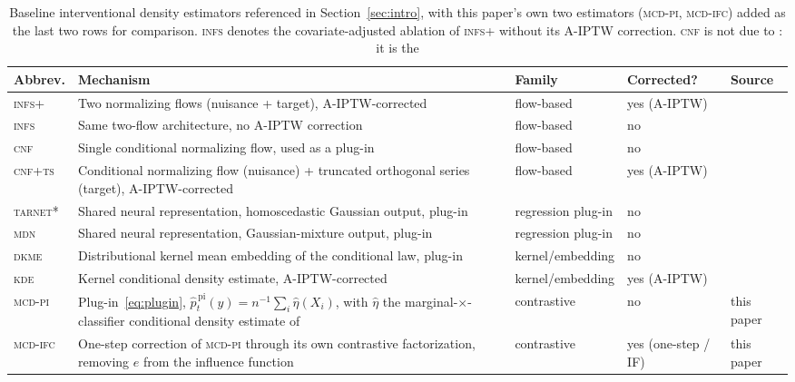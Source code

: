 \documentclass[11pt]{article}
\theoremstyle{plain}
\theoremstyle{definition}
\theoremstyle{remark}
\newcommand{\gps}{e}
\begin{document}
\begin{table}[htbp]
\centering
\small
\begin{tabular}{@{}lp{5.6cm}lll@{}}
\toprule
Abbrev. & Mechanism & Family & Corrected? & Source \\
\midrule
\textsc{infs+} & Two normalizing flows (nuisance + target), A-IPTW-corrected & flow-based & yes (A-IPTW) & \citet{melnychuk2023flows} \\
\textsc{infs} & Same two-flow architecture, no A-IPTW correction & flow-based & no & \citet{melnychuk2023flows} \\
\textsc{cnf} & Single conditional normalizing flow, used as a plug-in & flow-based & no & \citet{trippe2018cnf} \\
\textsc{cnf+ts} & Conditional normalizing flow (nuisance) + truncated orthogonal series (target), A-IPTW-corrected & flow-based & yes (A-IPTW) & \citet{kennedy2023density} \\
\textsc{tarnet*} & Shared neural representation, homoscedastic Gaussian output, plug-in & regression plug-in & no & \citet{shalit2017tarnet} \\
\textsc{mdn} & Shared neural representation, Gaussian-mixture output, plug-in & regression plug-in & no & \citet{bishop1994mdn} \\
\textsc{dkme} & Distributional kernel mean embedding of the conditional law, plug-in & kernel/embedding & no & \citet{muandet2021counterfactual} \\
\textsc{kde} & Kernel conditional density estimate, A-IPTW-corrected & kernel/embedding & yes (A-IPTW) & \citet{kim2018distributional} \\
\textsc{mcd-pi} & Plug-in~\eqref{eq:plugin}, $\widehat p^{\,\mathrm{pi}}_t(y) = n^{-1}\sum_i\widehat\eta(X_i)$, with $\widehat\eta$ the marginal-$\times$-classifier conditional density estimate of \citet{meziani2025mcd} & contrastive & no & this paper \\
\textsc{mcd-ifc} & One-step correction of \textsc{mcd-pi} through its own contrastive factorization, removing $\gps$ from the influence function & contrastive & yes (one-step / IF) & this paper \\
\bottomrule
\end{tabular}
\caption{Baseline interventional density estimators referenced in Section~\ref{sec:intro}, with
this paper's own two estimators (\textsc{mcd-pi}, \textsc{mcd-ifc}) added as the last two rows
for comparison. \textsc{infs} denotes the covariate-adjusted ablation of \textsc{infs+} without
its A-IPTW correction. \textsc{cnf} is not due to \citet{melnychuk2023flows}: it is the
}
\end{table}
\end{document}
